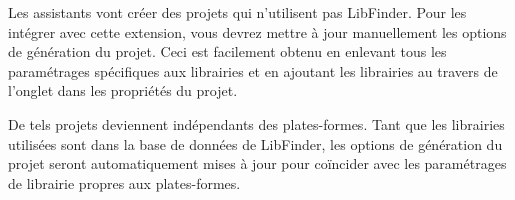 Les assistants vont créer des projets qui n'utilisent pas LibFinder. Pour les intégrer avec cette extension, vous devrez mettre à jour manuellement les options de génération du projet. Ceci est facilement obtenu en enlevant tous les paramétrages spécifiques aux librairies et en ajoutant les librairies au travers de l'onglet  dans les propriétés du projet.

De tels projets deviennent indépendants des plates-formes. Tant que les librairies utilisées sont dans la base de données de LibFinder, les options de génération du projet seront automatiquement mises à jour pour coïncider avec les paramétrages de librairie propres aux plates-formes.



